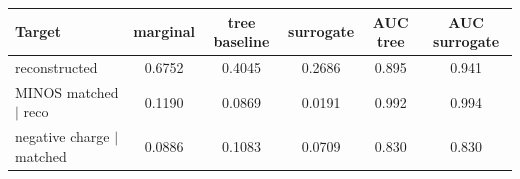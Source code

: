 \begin{tabular}{lccccc}
\toprule
Target & marginal & tree baseline & surrogate & AUC tree & AUC surrogate \\
\midrule
reconstructed & 0.6752 & 0.4045 & 0.2686 & 0.895 & 0.941 \\
MINOS matched $\mid$ reco & 0.1190 & 0.0869 & 0.0191 & 0.992 & 0.994 \\
negative charge $\mid$ matched & 0.0886 & 0.1083 & 0.0709 & 0.830 & 0.830 \\
\bottomrule
\end{tabular}
